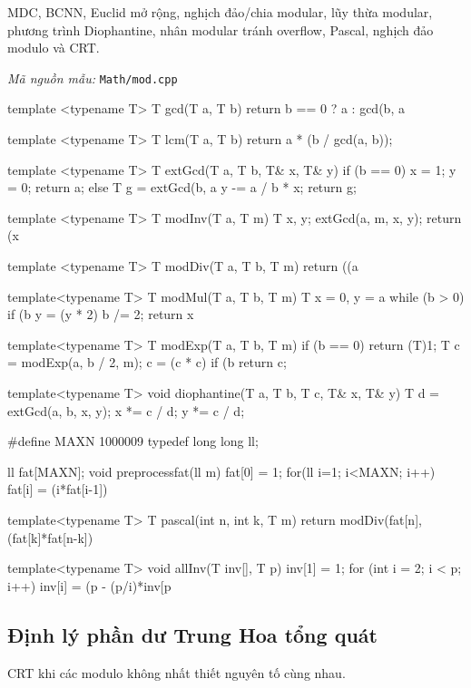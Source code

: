 \documentclass[11pt]{article}
\newcommand{\codepath}[1]{\par\noindent\textit{Mã nguồn mẫu:} \texttt{#1}\par}
\begin{document}
MDC, BCNN, Euclid mở rộng, nghịch đảo/chia modular, lũy thừa modular, phương trình Diophantine, nhân modular tránh overflow, Pascal, nghịch đảo modulo và CRT.

\codepath{Math/mod.cpp}

\begingroup\scriptsize
\begin{vncode}
template <typename T>
T gcd(T a, T b) {
	return b == 0 ? a : gcd(b, a %
}

template <typename T>
T lcm(T a, T b) {
		return a * (b / gcd(a, b));
}

template <typename T>
T extGcd(T a, T b, T& x, T& y) {
	if (b == 0) {
		x = 1; y = 0;
		return a;
	}
	else {
		T g = extGcd(b, a %
		y -= a / b * x;
		return g;
	}
}
 
template <typename T>
T modInv(T a, T m) {
	T x, y;
	extGcd(a, m, x, y);
	return (x %
}
 
template <typename T>
T modDiv(T a, T b, T m) {
	return ((a %
}

template<typename T>
T modMul(T a, T b, T m) {
	T x = 0, y = a %
	while (b > 0) {
		if (b %
		y = (y * 2) %
		b /= 2;
	}
	return x %
}

template<typename T>
T modExp(T a, T b, T m) {
	if (b == 0) return (T)1;
	T c = modExp(a, b / 2, m);
	c = (c * c) %
	if (b %
	return c;
}

template<typename T>
void diophantine(T a, T b, T c, T& x, T& y) {
	T d = extGcd(a, b, x, y);
	x *= c / d; y *= c / d;
}

#define MAXN 1000009
typedef long long ll;

ll fat[MAXN];
void preprocessfat(ll m) {
	fat[0] = 1;
	for(ll i=1; i<MAXN; i++) {
		fat[i] = (i*fat[i-1])%
	}
}

template<typename T>
T pascal(int n, int k, T m) {
	return modDiv(fat[n], (fat[k]*fat[n-k])%
}

template<typename T>
void allInv(T inv[], T p) {
	inv[1] = 1;
	for (int i = 2; i < p; i++)
		inv[i] = (p - (p/i)*inv[p%
}
\end{vncode}
\endgroup


\subsection{Định lý phần dư Trung Hoa tổng quát}

CRT khi các modulo không nhất thiết nguyên tố cùng nhau.
\end{document}
